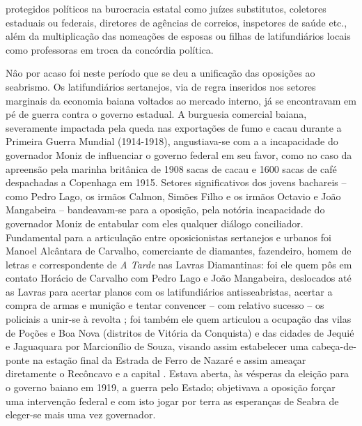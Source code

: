 protegidos políticos na burocracia estatal como juízes substitutos, coletores estaduais ou federais, diretores de agências de correios, inspetores de saúde etc., além da multiplicação das nomeações de esposas ou filhas de latifundiários locais como professoras em troca da concórdia política.

Nâo por acaso foi neste período que se deu a unificação das oposições ao seabrismo. Os latifundiários sertanejos, via de regra inseridos nos setores marginais da economia baiana voltados ao mercado interno, já se encontravam em pé de guerra contra o governo estadual. A burguesia comercial baiana, severamente impactada pela queda nas exportações de fumo e cacau durante a Primeira Guerra Mundial (1914-1918), angustiava-se com a a incapacidade do governador Moniz de influenciar o governo federal em seu favor, como no caso da apreensão pela marinha britânica de 1908 sacas de cacau e 1600 sacas de café despachadas a Copenhaga em 1915. Setores significativos dos jovens bachareis -- como Pedro Lago, os irmãos Calmon, Simões Filho e os irmãos Octavio e João Mangabeira -- bandeavam-se para a oposição, pela notória incapacidade do governador Moniz de entabular com eles qualquer diálogo conciliador. Fundamental para a articulação entre oposicionistas sertanejos e urbanos foi Manoel Alcântara de Carvalho, comerciante de diamantes, fazendeiro, homem de letras e correspondente de \textit{A Tarde} nas Lavras Diamantinas: foi ele quem pôs em contato Horácio de Carvalho com Pedro Lago e João Mangabeira, deslocados até as Lavras para acertar planos com os latifundiários antisseabristas, acertar a compra de armas e munição e tentar convencer -- com relativo sucesso -- os policiais a unir-se à revolta \cite[p.~201]{CUNHA2011}; foi também ele quem articulou a ocupação das vilas de Poções e Boa Nova (distritos de Vitória da Conquista) e das cidades de Jequié e Jaguaquara por Marcionílio de Souza, visando assim estabelecer uma cabeça-de-ponte na estação final da Estrada de Ferro de Nazaré e assim ameaçar diretamente o Recôncavo e a capital \cite[p.~202]{CUNHA2011}. Estava aberta, às vésperas da eleição para o governo baiano em 1919, a guerra pelo Estado; objetivava a oposição forçar uma intervenção federal e com isto jogar por terra as esperanças de Seabra de eleger-se mais uma vez governador.

